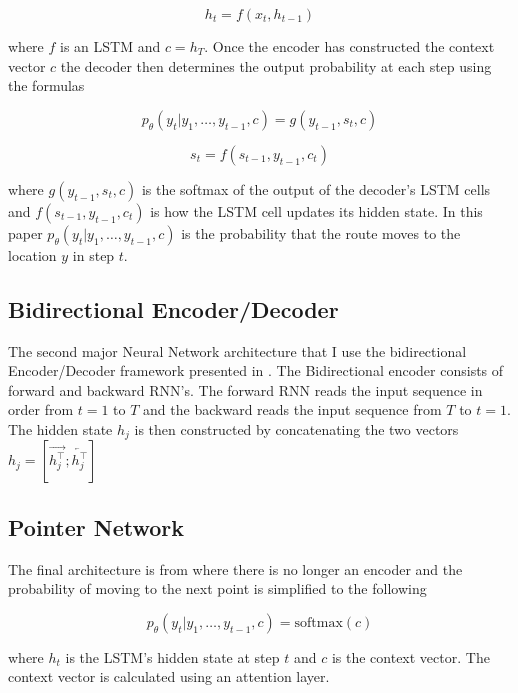 \documentclass[12pt]{article}
\begin{document}
\begin{equation*}
  h_t=f(x_t,h_{t-1})
\end{equation*}

where $f$ is an LSTM and $c=h_T$.
Once the encoder has constructed the context vector $c$ the decoder then determines the output probability at each step using the formulas

\begin{equation*}
  p_\theta(y_t|y_1,\dots,y_{t-1}, c)=g(y_{t-1},s_t, c)
\end{equation*}

\begin{equation*}
  s_t=f(s_{t-1},y_{t-1},c_t)
\end{equation*}

where $g(y_{t-1},s_t, c)$ is the softmax of the output of the decoder's LSTM cells and $f(s_{t-1},y_{t-1},c_t)$ is how the LSTM cell updates its hidden state. In this paper $p_\theta(y_t|y_1,\dots,y_{t-1}, c)$ is the probability that the route moves to the location $y$ in step $t$.

\subsection{Bidirectional Encoder/Decoder}

The second major Neural Network architecture that I use the bidirectional Encoder/Decoder framework presented in \citet{2014_bah}. The Bidirectional encoder consists of forward and backward RNN's. The forward RNN reads the input sequence in order from $t=1$ to $T$ and the backward reads the input sequence from $T$ to $t=1$. The hidden state $h_j$ is then constructed by concatenating the two vectors $h_j=[\overrightarrow{h_j^\top};\overleftarrow{h_j^\top}]$

\subsection{Pointer Network}

The final architecture is from \citet{2015_Vinyals} where there is no longer an encoder and the probability of moving to the next point is simplified to the following

\begin{equation*}
  p_\theta(y_t|y_1,\dots,y_{t-1}, c)=\text{softmax}(c)
\end{equation*}

where $h_t$ is the LSTM's hidden state at step $t$ and $c$ is the context vector. The context vector is calculated using an attention layer.
\end{document}
